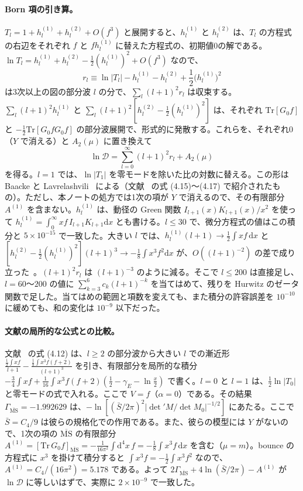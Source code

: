 \documentclass[a4paper,10pt]{ltjsarticle}
\newcommand{\dd}{\mathrm{d}}
\begin{document}
\paragraph{Born 項の引き算。}$T_l=1+h_l^{(1)}+h_l^{(2)}+O(f^3)$ と展開すると、$h_l^{(1)}$ と $h_l^{(2)}$ は、$T_l$ の方程式の右辺をそれぞれ $f$ と $fh_l^{(1)}$ に替えた方程式の、初期値0の解である。$\ln T_l=h_l^{(1)}+h_l^{(2)}-\frac12(h_l^{(1)})^2+O(f^3)$ なので、
\begin{equation*}
r_l\equiv\ln|T_l|-h_l^{(1)}-h_l^{(2)}+\frac12\bigl(h_l^{(1)}\bigr)^2
\end{equation*}
は3次以上の図の部分波 $l$ の分で、$\sum_l(l+1)^2r_l$ は収束する。$\sum_l(l+1)^2h_l^{(1)}$ と $\sum_l(l+1)^2[h_l^{(2)}-\frac12(h_l^{(1)})^2]$ は、それぞれ $\mathrm{Tr}[G_0f]$ と $-\frac12\mathrm{Tr}[G_0fG_0f]$ の部分波展開で、形式的に発散する。これらを、それぞれ0（$Y$ で消える）と $A_2(\mu)$ に置き換えて
\begin{equation*}
\ln\mathcal D=\sum_{l=0}^\infty(l+1)^2r_l+A_2(\mu)
\end{equation*}
を得る。$l=1$ では、$\ln|T_1|$ を零モードを除いた比の対数に替える。この形は Baacke と Lavrelashvili~\cite{bl} による（文献~\cite{dunnemin} の式 (4.15)〜(4.17) で紹介されたもの）。ただし、本ノートの処方では1次の項が $Y$ で消えるので、その有限部分 $A^{(1)}$ を含まない。$h_l^{(1)}$ は、動径の Green 関数 $I_{l+1}(x)K_{l+1}(x)/x^2$ を使って $h_l^{(1)}=\int_0^\infty xf\,I_{l+1}K_{l+1}\dd x$ とも書ける。$l\le30$ で、微分方程式の値はこの積分と $5\times10^{-15}$ で一致した。大きい $l$ では、$h_l^{(1)}(l+1)\to\frac12\int xf\,\dd x$ と $[h_l^{(2)}-\frac12(h_l^{(1)})^2](l+1)^3\to-\frac18\int x^3f^2\dd x$ が、$O((l+1)^{-2})$ の差で成り立った~\cite{dunnemin}。$(l+1)^2r_l$ は $(l+1)^{-3}$ のように減る。そこで $l\le200$ は直接足し、$l=60$〜$200$ の値に $\sum_{k=3}^6c_k(l+1)^{-k}$ を当てはめて、残りを Hurwitz のゼータ関数で足した。当てはめの範囲と項数を変えても、また積分の許容誤差を $10^{-10}$ に緩めても、和の変化は $10^{-9}$ 以下だった。

\paragraph{文献の局所的な公式との比較。}文献~\cite{dunnemin} の式 (4.12) は、$l\ge2$ の部分波から大きい $l$ での漸近形 $\frac{\frac12\int xf}{l+1}-\frac{\frac18\int x^3f(f+2)}{(l+1)^3}$ を引き、有限部分を局所的な積分 $-\frac34\int xf+\frac1{16}\int x^3f(f+2)(\frac12-\gamma_E-\ln\frac x2)$ で書く。$l=0$ と $l=1$ は、$\frac12\ln|T_0|$ と零モードの式で入れる。ここで $V=f$（$\alpha=0$）である。その結果 $\Gamma_{\overline{\mathrm{MS}}}=-1.992629$ は、$-\ln[(\bar S/2\pi)^2|\det'M/\det M_0|^{-1/2}]$ にあたる。ここで $\bar S=C_4/9$ は彼らの規格化での作用である。また、彼らの模型には $Y$ がないので、1次の項の $\overline{\mathrm{MS}}$ の有限部分 $A^{(1)}=[\mathrm{Tr}\,G_0f]_{\overline{\mathrm{MS}}}=-\frac{1}{16\pi^2}\int\dd^4x\,f=-\frac18\int x^3f\,\dd x$ を含む（$\mu=m$）。bounce の方程式に $x^3$ を掛けて積分すると $\int x^3f=-\frac12\int x^3f^2$ なので、$A^{(1)}=C_4/(16\pi^2)=5.178$ である。よって $2\Gamma_{\overline{\mathrm{MS}}}+4\ln(\bar S/2\pi)-A^{(1)}$ が $\ln\mathcal D$ に等しいはずで、実際に $2\times10^{-9}$ で一致した。
\end{document}
